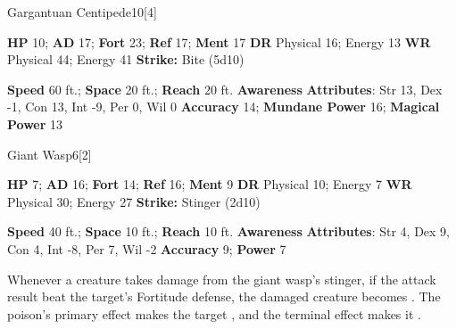   
  \begin{monsection}{Gargantuan Centipede}{10}[4]
    \vspace{-1em}\vspace{-1em}
    \begin{spellcontent}
      \begin{spelltargetinginfo}
        \pari \textbf{HP} 10;
          \textbf{AD} 17;
          \textbf{Fort} 23;
          \textbf{Ref} 17;
          \textbf{Ment} 17
        \pari \textbf{DR} Physical 16; Energy 13
        \pari \textbf{WR} Physical 44; Energy 41
        \pari \textbf{Strike:}
            Bite  (5d10)
      \end{spelltargetinginfo}
    \end{spellcontent}
    \begin{monsterfooter}
      \pari \textbf{Speed} 60 ft.;
        \textbf{Space} 20 ft.;
        \textbf{Reach} 20 ft.
      \pari \textbf{Awareness} 
      \pari \textbf{Attributes}:
        Str 13, Dex -1, Con 13,
        Int -9, Per 0, Wil 0
      \pari \textbf{Accuracy} 14;
        \textbf{Mundane Power} 16;
      \textbf{Magical Power} 13
    \end{monsterfooter}
  \end{monsection}
  
  
  \begin{monsection}{Giant Wasp}{6}[2]
    \vspace{-1em}\vspace{-1em}
    \begin{spellcontent}
      \begin{spelltargetinginfo}
        \pari \textbf{HP} 7;
          \textbf{AD} 16;
          \textbf{Fort} 14;
          \textbf{Ref} 16;
          \textbf{Ment} 9
        \pari \textbf{DR} Physical 10; Energy 7
        \pari \textbf{WR} Physical 30; Energy 27
        \pari \textbf{Strike:}
            Stinger  (2d10)
      \end{spelltargetinginfo}
    \end{spellcontent}
    \begin{monsterfooter}
      \pari \textbf{Speed} 40 ft.;
        \textbf{Space} 10 ft.;
        \textbf{Reach} 10 ft.
      \pari \textbf{Awareness} 
      \pari \textbf{Attributes}:
        Str 4, Dex 9, Con 4,
        Int -8, Per 7, Wil -2
      \pari \textbf{Accuracy} 9;
        \textbf{Power} 7
    \end{monsterfooter}
  \end{monsection}
        Whenever a creature takes damage from the giant wasp's stinger,
          if the attack result beat the target's Fortitude defense,
          the damaged creature becomes .
        The poison's primary effect makes the target , and the terminal effect makes it .
  
